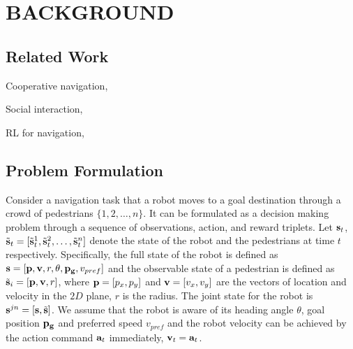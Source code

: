 \documentclass[letterpaper, 10 pt, conference]{ieeeconf}  %
\begin{document}
\section{BACKGROUND} \label{sec:background} 

\subsection{Related Work}

Cooperative navigation, 
\vspace{3.4cm}

Social interaction, 
\vspace{4cm}

RL for navigation, 
\vspace{4cm}

\subsection{Problem Formulation}

Consider a navigation task that a robot moves to a goal destination through a crowd of pedestrians $\{1,2,\dots,n\}$. It can be formulated as a decision making problem through a sequence of observations, action, and reward triplets\cite{chen_decentralized_2016,chen_socially_2017,everett_motion_2018}. Let $\bold{s}_t $, $\tilde{\bold{s}}_t = [\tilde{\bold{s}}_t^1, \tilde{\bold{s}}_t^2, \dots, \tilde{\bold{s}}_t^n]$ denote the state of the robot and the pedestrians at time $t$ respectively. Specifically, the full state of the robot is defined as $ \bold{s} = [\bold{p}, \bold{v}, r, \theta, \bold{p_g}, v_{pref}]$ and the observable state of a pedestrian is defined as $ \tilde{\bold{s}}_i = [\bold{p}, \bold{v}, r]$, where $\bold{p}=[p_x,p_y]$ and $\bold{v}=[v_x,v_y]$ are the vectors of location and velocity in the $2D$ plane, $r$ is the radius. The joint state for the robot is $\bold{s}^{jn} = [\bold{s}, \tilde{\bold{s}}]$. We assume that the robot is aware of its heading angle $\theta$, goal position $\bold{p_g}$ and preferred speed $v_{pref}$ and the robot velocity can be achieved by the action command $\bold{a}_t$ immediately, $\bold{v}_t = \bold{a}_t$. 
\end{document}
